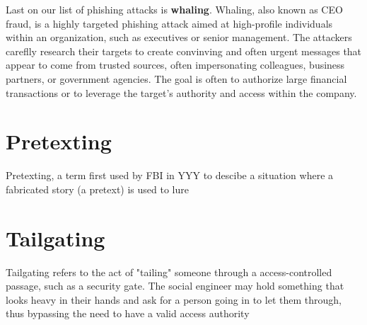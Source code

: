 Last on our list of phishing attacks is \textbf{whaling}. Whaling, also known as CEO fraud, is a highly targeted phishing attack aimed at high-profile individuals within an organization, such as executives or senior management. The attackers careflly research their targets to create convinving and often urgent messages that appear to come from trusted sources, often impersonating colleagues, business partners, or government agencies. The goal is often to authorize large financial transactions or to leverage the target's authority and access within the company.

\section{Pretexting}

Pretexting, a term first used by FBI in YYY to descibe a situation where a fabricated story (a pretext) is used to  lure

\section{Tailgating}

Tailgating refers to the act of "tailing" someone through a access-controlled passage, such as a security gate. The social engineer may hold something that looks heavy in their hands and ask for a person going in to let them through, thus bypassing the need to have a valid access authority





